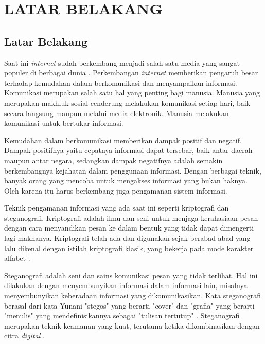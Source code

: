 
\chapter{LATAR BELAKANG}

\section{Latar Belakang}
Saat ini \emph{internet} sudah berkembang menjadi salah satu media yang sangat populer di berbagai dunia \cite{bunyamin}. Perkembangan \emph{internet} memberikan pengaruh besar terhadap kemudahan dalam berkomunikasi dan menyampaikan informasi. Komunikasi merupakan salah satu hal yang penting bagi manusia. Manusia yang merupakan makhluk sosial cenderung melakukan komunikasi setiap hari, baik secara langsung maupun melalui media elektronik. Manusia melakukan komunikasi untuk bertukar informasi.

Kemudahan dalam berkomunikasi memberikan dampak positif dan negatif. Dampak positifnya yaitu cepatnya informasi dapat tersebar, baik antar daerah maupun antar negara, sedangkan dampak negatifnya adalah semakin berkembangnya kejahatan dalam penggunaan informasi. Dengan berbagai teknik, banyak orang yang mencoba untuk mengakses informasi yang bukan haknya. Oleh karena itu harus berkembang juga pengamanan sistem informasi.

Teknik pengamanan informasi yang ada saat ini seperti kriptografi dan steganografi. Kriptografi adalah ilmu dan seni untuk menjaga kerahasiaan pesan dengan cara menyandikan pesan  ke dalam bentuk yang tidak dapat dimengerti lagi maknanya. Kriptografi telah ada dan digunakan sejak berabad-abad yang lalu dikenal dengan istilah kriptografi klasik, yang bekerja pada mode karakter alfabet  \cite{rakhmat}.

Steganografi adalah seni dan sains komunikasi pesan yang tidak terlihat. Hal ini dilakukan dengan menyembunyikan informasi dalam informasi lain, misalnya menyembunyikan keberadaan informasi yang dikomunikasikan. Kata steganografi berasal dari kata Yunani "stegos" yang berarti "cover" dan "grafia" yang berarti "menulis" yang mendefinisikannya sebagai "tulisan tertutup" \cite{kadam}. Steganografi merupakan teknik keamanan yang kuat, terutama ketika dikombinasikan dengan citra \emph{digital} \cite{gautam}.

